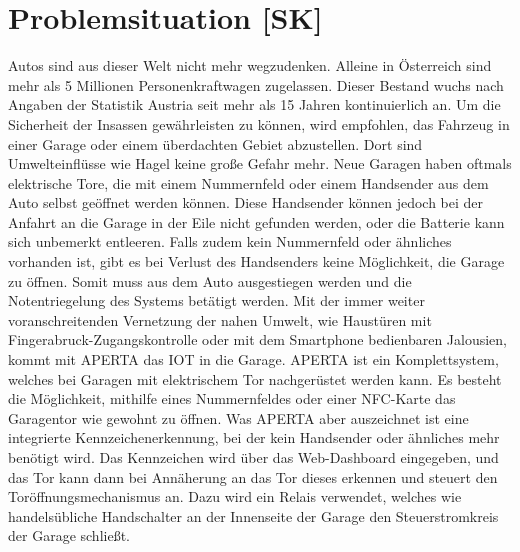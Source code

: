 \section{Problemsituation [SK]}
Autos sind aus dieser Welt nicht mehr wegzudenken. Alleine in Österreich sind mehr als 5 Millionen Personenkraftwagen zugelassen. Dieser Bestand wuchs nach Angaben der Statistik Austria seit mehr als 15 Jahren kontinuierlich an.\cite{StatAustPKW} Um die Sicherheit der Insassen gewährleisten zu können, wird empfohlen, das Fahrzeug in einer Garage oder einem überdachten Gebiet abzustellen. Dort sind Umwelteinflüsse wie Hagel keine große Gefahr mehr. Neue Garagen haben oftmals elektrische Tore, die mit einem Nummernfeld oder einem Handsender aus dem Auto selbst geöffnet werden können. Diese Handsender können jedoch bei der Anfahrt an die Garage in der Eile nicht gefunden werden, oder die Batterie kann sich unbemerkt entleeren. Falls zudem kein Nummernfeld oder ähnliches vorhanden ist, gibt es bei Verlust des Handsenders keine Möglichkeit, die Garage zu öffnen. Somit muss aus dem Auto ausgestiegen werden und die Notentriegelung des Systems betätigt werden.
Mit der immer weiter voranschreitenden Vernetzung der nahen Umwelt, wie Haustüren mit Fingerabruck-Zugangskontrolle oder mit dem Smartphone bedienbaren Jalousien, kommt mit APERTA das IOT in die Garage.
APERTA ist ein Komplettsystem, welches bei Garagen mit elektrischem Tor nachgerüstet werden kann. Es besteht die Möglichkeit, mithilfe eines Nummernfeldes oder einer NFC-Karte das Garagentor wie gewohnt zu öffnen. Was APERTA aber auszeichnet ist eine integrierte Kennzeichenerkennung, bei der kein Handsender oder ähnliches mehr benötigt wird. Das Kennzeichen wird über das Web-Dashboard eingegeben, und das Tor kann dann bei Annäherung an das Tor dieses erkennen und steuert den Toröffnungsmechanismus an. Dazu wird ein Relais verwendet, welches wie handelsübliche Handschalter an der Innenseite der Garage den Steuerstromkreis der Garage schließt.

